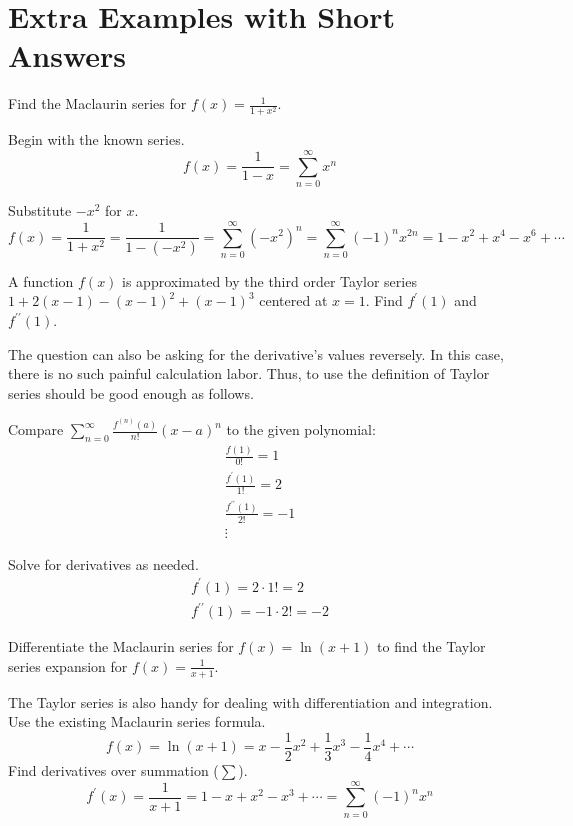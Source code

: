 \newpage 


\section*{Extra Examples with Short Answers}

Find the Maclaurin series for $f(x)=\frac{1}{1+x^{2}}$.
\begin{subanswer}
Begin with the known series.
$$
f(x)=\frac{1}{1-x}=\sum_{n=0}^{\infty} x^{n}
$$

Substitute $-x^{2}$ for $x$.
$$
f(x)=\frac{1}{1+x^{2}}=\frac{1}{1-\left(-x^{2}\right)}=\sum_{n=0}^{\infty}\left(-x^{2}\right)^{n}=\sum_{n=0}^{\infty}(-1)^{n} x^{2 n}=1-x^{2}+x^{4}-x^{6}+\cdots
$$
\end{subanswer}

A function $f(x)$ is approximated by the third order Taylor series $1+2(x-1)-(x-1)^{2}+(x-1)^{3}$ centered at $x=1$. Find $f^{\prime}(1)$ and $f^{\prime \prime}(1)$.
\begin{subanswer}
The question can also be asking for the derivative's values reversely. In this case, there is no such painful calculation labor. Thus, to use the definition of Taylor series should be good enough as follows.

Compare $\sum_{n=0}^{\infty} \frac{f^{(n)}(a)}{n!}(x-a)^{n}$ to the given polynomial:
$$
\begin{gathered}
\frac{f(1)}{0!}=1 \\
\frac{f^{\prime}(1)}{1!}=2 \\
\frac{f^{\prime \prime}(1)}{2!}=-1 \\
\vdots
\end{gathered}
$$

Solve for derivatives as needed.
$$
\begin{gathered}
f^{\prime}(1)=2 \cdot 1!=2 \\
f^{\prime \prime}(1)=-1 \cdot 2!=-2
\end{gathered}
$$
\end{subanswer}

Differentiate the Maclaurin series for $f(x)=\ln (x+1)$ to find the Taylor series expansion for $f(x)=\frac{1}{x+1}$.
\begin{subanswer}
The Taylor series is also handy for dealing with differentiation and integration.\\
Use the existing Maclaurin series formula.
$$
f(x)=\ln (x+1)=x-\frac{1}{2} x^{2}+\frac{1}{3} x^{3}-\frac{1}{4} x^{4}+\cdots
$$
Find derivatives over summation ($\sum$).
$$
f^{\prime}(x)=\frac{1}{x+1}=1-x+x^{2}-x^{3}+\cdots=\sum_{n=0}^{\infty}(-1)^{n} x^{n}
$$
\end{subanswer}














